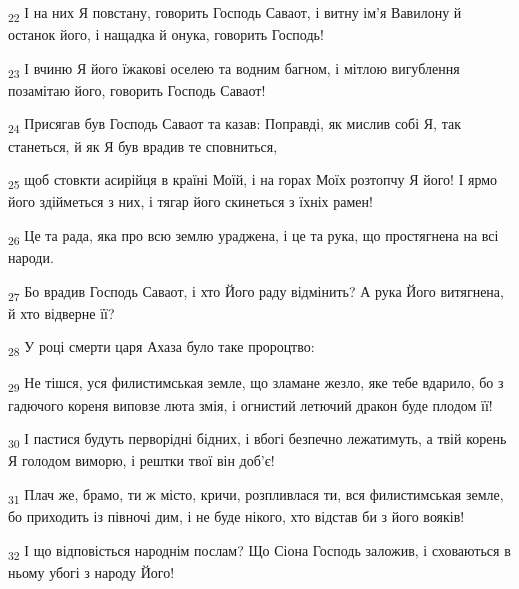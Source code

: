 \begin{tcolorbox}
\textsubscript{22} І на них Я повстану, говорить Господь Саваот, і витну ім'я Вавилону й останок його, і нащадка й онука, говорить Господь!
\end{tcolorbox}
\begin{tcolorbox}
\textsubscript{23} І вчиню Я його їжакові оселею та водним багном, і мітлою вигублення позамітаю його, говорить Господь Саваот!
\end{tcolorbox}
\begin{tcolorbox}
\textsubscript{24} Присягав був Господь Саваот та казав: Поправді, як мислив собі Я, так станеться, й як Я був врадив те сповниться,
\end{tcolorbox}
\begin{tcolorbox}
\textsubscript{25} щоб стовкти асирійця в країні Моїй, і на горах Моїх розтопчу Я його! І ярмо його здійметься з них, і тягар його скинеться з їхніх рамен!
\end{tcolorbox}
\begin{tcolorbox}
\textsubscript{26} Це та рада, яка про всю землю ураджена, і це та рука, що простягнена на всі народи.
\end{tcolorbox}
\begin{tcolorbox}
\textsubscript{27} Бо врадив Господь Саваот, і хто Його раду відмінить? А рука Його витягнена, й хто відверне її?
\end{tcolorbox}
\begin{tcolorbox}
\textsubscript{28} У році смерти царя Ахаза було таке пророцтво:
\end{tcolorbox}
\begin{tcolorbox}
\textsubscript{29} Не тішся, уся филистимськая земле, що зламане жезло, яке тебе вдарило, бо з гадючого кореня виповзе люта змія, і огнистий летючий дракон буде плодом її!
\end{tcolorbox}
\begin{tcolorbox}
\textsubscript{30} І пастися будуть перворідні бідних, і вбогі безпечно лежатимуть, а твій корень Я голодом виморю, і рештки твої він доб'є!
\end{tcolorbox}
\begin{tcolorbox}
\textsubscript{31} Плач же, брамо, ти ж місто, кричи, розпливлася ти, вся филистимськая земле, бо приходить із півночі дим, і не буде нікого, хто відстав би з його вояків!
\end{tcolorbox}
\begin{tcolorbox}
\textsubscript{32} І що відповісться народнім послам? Що Сіона Господь заложив, і сховаються в ньому убогі з народу Його!
\end{tcolorbox}
